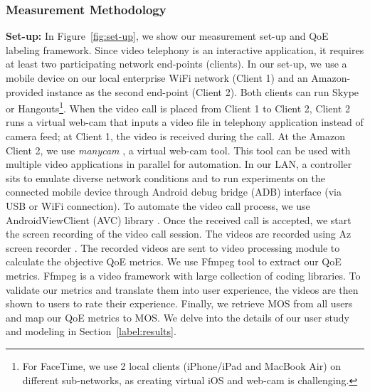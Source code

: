 \subsubsection{Measurement Methodology}

\noindent \textbf{Set-up:} 
In Figure~\ref{fig:set-up}, we show our measurement set-up and QoE labeling framework. 
Since video telephony is an interactive application, it requires at least two participating network end-points (clients). In our set-up, we use a mobile device on our local enterprise WiFi network (Client 1) and an Amazon-provided instance as the second end-point (Client 2). Both clients can run Skype or Hangouts\footnote{For FaceTime, we use 2 local clients (iPhone/iPad and MacBook Air) on different sub-networks, as creating virtual iOS and web-cam is challenging.}. 
When the video call is placed from Client 1 to Client 2, Client 2 runs a virtual web-cam that inputs a video file in telephony application instead of camera feed; at Client 1, the video is received during the call.
At the Amazon Client 2, we use \textit{manycam} \cite{mancam}, a virtual web-cam tool. 
This tool can be used with multiple video applications in parallel for automation. 
In our LAN, a controller sits  to emulate diverse network conditions and to run experiments on the connected mobile device  through Android debug bridge (ADB) interface (via USB or WiFi connection). 
To automate the video call process, we use AndroidViewClient (AVC) library \cite{awc}.
Once the received call is accepted, we start the screen recording of the video call session.   The videos are recorded using Az screen recorder \cite{azscreen}. 
The recorded videos are sent to video processing module to calculate the objective QoE metrics. 
We use Ffmpeg \cite{ffmpeg} tool to extract our QoE metrics. Ffmpeg is a video framework with large collection of coding libraries. To validate our metrics and translate them into user experience, the videos are then shown to users to rate their experience. 
Finally, we retrieve MOS from all users and map our QoE metrics to MOS. We delve into the details of our user  study and modeling in Section~\ref{label:results}.


